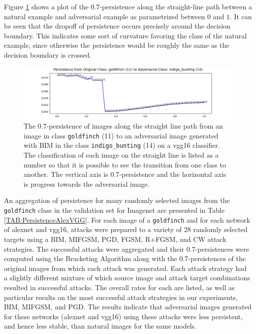Figure \ref{fig:persistent_interpimage} shows a plot of the $0.7$-persistence along the straight-line path between a natural example and adversarial example as parametrized between $0$ and $1$. It can be seen that the dropoff of persistence occurs precisely around the decision boundary. This indicates some sort of curvature favoring the class of the natural example, since otherwise the persistence would be roughly the same as the decision boundary is crossed.

\begin{figure}[ht]
\centering
\includegraphics[width = \textwidth]
{c2_figures/persistence_interpolation-IMNET-class-11-vgg16-BIM-48-attack_data-001.png}
\caption{The $0.7$-persistence of images along the straight line path from an image in class \texttt{goldfinch} (11) to an adversarial image generated with BIM in the class \texttt{indigo\_bunting} (14) on a vgg16 classifier. The classification of each image on the straight line is listed as a number so that it is possible to see the transition from one class to another. The vertical axis is $0.7$-persistence and the horizontal axis is progress towards the adversarial image.}\label{fig:persistent_interpimage}
\end{figure}

An aggregation of persistence for many randomly selected images from the \texttt{goldfinch} class in the validation set for Imagenet are presented in Table \ref{TAB:PersistenceAlexVGG}. For each image of a \texttt{goldfinch} and for each network of alexnet and vgg16, attacks were prepared to a variety of 28 randomly selected targets using a BIM, MIFGSM, PGD, FGSM, R+FGSM, and CW attack strategies. The successful attacks were aggregated and their $0.7$-persistences were computed using the Bracketing Algorithm along with the $0.7$-persistences of the original images from which each attack was generated. Each attack strategy had a slightly different mixture of which source image and attack target combinations resulted in successful attacks. The overall rates for each are listed, as well as particular results on the most successful attack strategies in our experiments, BIM, MIFGSM, and PGD. The results indicate that adversarial images generated for these networks (alexnet and vgg16) using these attacks were less persistent, and hence less stable, than natural images for the same models. 


